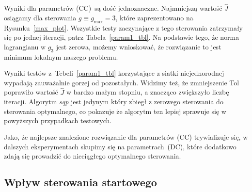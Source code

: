\documentclass[licencjacka]{pracamgr}
\begin{document}
Wyniki dla parametrów (CC)\ są dość jednoznaczne. Najmniejszą wartość $\hat{J}$ osiągamy dla sterowania $g \equiv g_{\max} = 3$, które zaprezentowano na Rysunku~\ref{max_plot}. Wszystkie testy zaczynające z tego sterowania zatrzymały się po jednej iteracji, patrz Tabela~\ref{param1_tbl}. Na podstawie tego, że norma lagrangianu w $g_3$ jest zerowa, możemy wnioskować, że rozwiązanie to jest minimum lokalnym naszego problemu.

Wyniki testów z~Tebeli~\ref{param1_tbl} korzystające z siatki niejednorodnej wypadają zauważalnie gorzej od pozostałych. Widzimy też, że zmniejszenie Tol poprawiło wartość $\hat{J}$ w bardzo małym stopniu, a znacząco zwiększyło liczbę iteracji. Algorytm {\it sqp\/} jest jedynym który zbiegł z zerowego sterowania do sterowania optymalnego, co pokazuje że algorytm ten lepiej sprawuje się w powyższych przypadkach testowych.

Jako, że najlepsze znalezione rozwiązanie dla parametrów (CC) trywializuje się, w dalszych eksperymentach skupimy się na parametrach~(DC), które dodatkowo zdają się prowadzić do nieciągłego optymalnego sterowania.

\subsection{Wpływ sterowania startowego}
\end{document}
